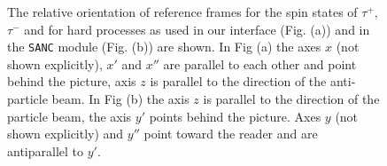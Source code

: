 \documentclass[]{Tauola_interface_design}
\begin{document}
\begin{figure}[h!]
\centering
{}
\caption{
The relative orientation of reference frames for the spin states
of $\tau^+$, $\tau^-$ and for hard processes as used in our interface (Fig. (a)) and in the {\tt SANC} module (Fig. (b)) are shown. In Fig (a) the axes $x$ (not shown explicitly), $x'$ and $x''$ 
are parallel to each other 
and  point behind the picture, axis $z$ is parallel to the direction  
of the anti-particle beam. In Fig (b) the axis $z$ is parallel to the direction of the particle beam, the axis 
$y'$ points behind the picture. Axes $y$ (not shown explicitly) and $y''$ point toward the reader and
are antiparallel to $y'$.  
}
\end{figure}

\end{document}
